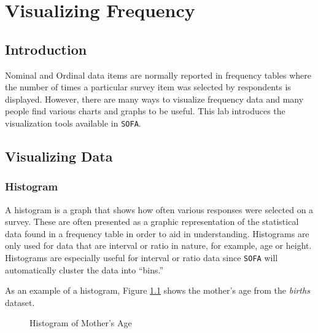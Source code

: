 \chapter{Visualizing Frequency}\label{vfr:visualizing_frequency}

\section{Introduction}

Nominal and Ordinal data items are normally reported in frequency tables where the number of times a particular survey item was selected by respondents is displayed. However, there are many ways to visualize frequency data and many people find various charts and graphs to be useful. This lab introduces the visualization tools available in \texttt{SOFA}.

\section{Visualizing Data}

\subsection{Histogram} A histogram is a graph that shows how often various responses were selected on a survey. These are often presented as a graphic representation of the statistical data found in a frequency table in order to aid in understanding. Histograms are only used for data that are interval or ratio in nature, for example, age or height. Histograms are especially useful for interval or ratio data since \texttt{SOFA} will automatically cluster the data into ``bins.''

As an example of a histogram, Figure \ref{vfr:img01} shows the mother's age from the \textit{births} dataset.

\begin{figure}[H]
  \begin{center}
    \caption{Histogram of Mother's Age}
    \label{vfr:img01}
  \end{center}
\end{figure}

